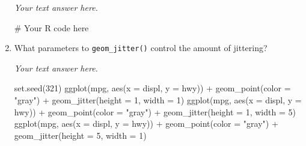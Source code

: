 \documentclass[
  letterpaper,
  DIV=11,
  numbers=noendperiod]{scrreprt}
\newenvironment{Shaded}{\begin{snugshade}}{\end{snugshade}}
\newcommand{\AttributeTok}[1]{\textcolor[rgb]{0.40,0.45,0.13}{#1}}
\newcommand{\CommentTok}[1]{\textcolor[rgb]{0.37,0.37,0.37}{#1}}
\newcommand{\DecValTok}[1]{\textcolor[rgb]{0.68,0.00,0.00}{#1}}
\newcommand{\FunctionTok}[1]{\textcolor[rgb]{0.28,0.35,0.67}{#1}}
\newcommand{\NormalTok}[1]{\textcolor[rgb]{0.00,0.23,0.31}{#1}}
\newcommand{\SpecialCharTok}[1]{\textcolor[rgb]{0.37,0.37,0.37}{#1}}
\newcommand{\StringTok}[1]{\textcolor[rgb]{0.13,0.47,0.30}{#1}}
\begin{document}
\begin{enumerate}
\begin{tcolorbox}
  \emph{Your text answer here.}

  \end{tcolorbox}

\begin{Shaded}
\begin{Highlighting}[]
\CommentTok{\# Your R code here}
\end{Highlighting}
\end{Shaded}

  \begin{figure}

  \end{figure}
\item
  What parameters to \texttt{geom\_jitter()} control the amount of
  jittering?

  \begin{tcolorbox}[enhanced jigsaw, breakable, bottomtitle=1mm, left=2mm, colback=white, toprule=.15mm, leftrule=.75mm, colframe=quarto-callout-note-color-frame, colbacktitle=quarto-callout-note-color!10!white, title={Answer}, coltitle=black, toptitle=1mm, bottomrule=.15mm, opacitybacktitle=0.6, arc=.35mm, rightrule=.15mm, titlerule=0mm, opacityback=0]

  \emph{Your text answer here.}

  \end{tcolorbox}

\begin{Shaded}
\begin{Highlighting}[]
\FunctionTok{set.seed}\NormalTok{(}\DecValTok{321}\NormalTok{)}
\FunctionTok{ggplot}\NormalTok{(mpg, }\FunctionTok{aes}\NormalTok{(}\AttributeTok{x =}\NormalTok{ displ, }\AttributeTok{y =}\NormalTok{ hwy)) }\SpecialCharTok{+}
  \FunctionTok{geom\_point}\NormalTok{(}\AttributeTok{color =} \StringTok{"gray"}\NormalTok{) }\SpecialCharTok{+}
  \FunctionTok{geom\_jitter}\NormalTok{(}\AttributeTok{height =} \DecValTok{1}\NormalTok{, }\AttributeTok{width =} \DecValTok{1}\NormalTok{)}
\FunctionTok{ggplot}\NormalTok{(mpg, }\FunctionTok{aes}\NormalTok{(}\AttributeTok{x =}\NormalTok{ displ, }\AttributeTok{y =}\NormalTok{ hwy)) }\SpecialCharTok{+}
  \FunctionTok{geom\_point}\NormalTok{(}\AttributeTok{color =} \StringTok{"gray"}\NormalTok{) }\SpecialCharTok{+}
  \FunctionTok{geom\_jitter}\NormalTok{(}\AttributeTok{height =} \DecValTok{1}\NormalTok{, }\AttributeTok{width =} \DecValTok{5}\NormalTok{)}
\FunctionTok{ggplot}\NormalTok{(mpg, }\FunctionTok{aes}\NormalTok{(}\AttributeTok{x =}\NormalTok{ displ, }\AttributeTok{y =}\NormalTok{ hwy)) }\SpecialCharTok{+}
  \FunctionTok{geom\_point}\NormalTok{(}\AttributeTok{color =} \StringTok{"gray"}\NormalTok{) }\SpecialCharTok{+}
  \FunctionTok{geom\_jitter}\NormalTok{(}\AttributeTok{height =} \DecValTok{5}\NormalTok{, }\AttributeTok{width =} \DecValTok{1}\NormalTok{)}
\end{Highlighting}
\end{Shaded}


\end{enumerate}
\end{document}
